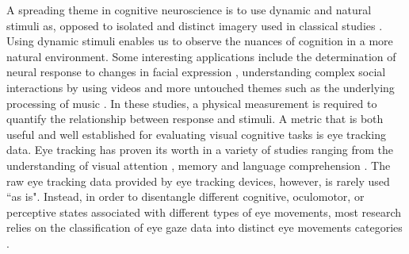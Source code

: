 A spreading theme in cognitive neuroscience is to use dynamic and natural stimuli as, opposed to isolated and distinct imagery used in classical studies \citep{real_world}. Using dynamic stimuli enables us to observe the nuances of cognition in a more natural environment. Some interesting applications include the determination of neural response to changes in facial expression \citep{Harris2014}, understanding complex social interactions by using videos \citep{Tikka2012} and more untouched themes such as the underlying processing of music \citep{Toiviainen2014}. In these studies, a physical measurement is required to quantify the relationship between response and stimuli. A metric that is both useful and well established for evaluating visual cognitive tasks is eye tracking data. Eye tracking has proven its worth in a variety of studies ranging from the understanding of visual attention \citep{HantaoLiu2011}, memory \citep{Hannula2010} and language comprehension \citep{Gordon2006}. The raw eye tracking data provided by eye tracking devices, however, is rarely used ``as is". Instead, in order to disentangle different cognitive, oculomotor, or perceptive states associated with different types of eye movements, most research relies on the classification of eye gaze data into distinct eye movements categories \citep{Schutz2011}. \\

